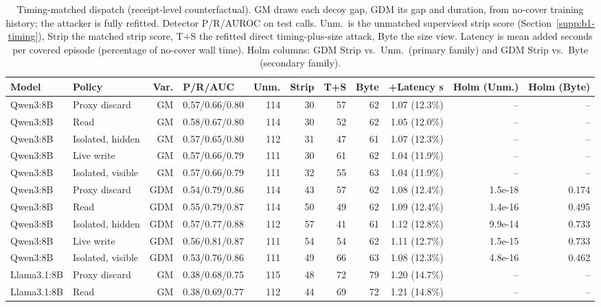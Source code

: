 \begin{table}[t]\centering\small
\caption{Timing-matched dispatch (receipt-level counterfactual). GM draws each decoy gap, GDM its gap and duration, from no-cover training history; the attacker is fully refitted. Detector P/R/AUROC on test calls. Unm.\ is the unmatched supervised strip score (Section~\ref{supp:b1-timing}), Strip the matched strip score, T+S the refitted direct timing-plus-size attack, Byte the size view. Latency is mean added seconds per covered episode (percentage of no-cover wall time). Holm columns: GDM Strip vs.\ Unm.\ (primary family) and GDM Strip vs.\ Byte (secondary family).}\label{tab:c3}
\setlength{\tabcolsep}{4pt}
\begin{tabularx}{\textwidth}{@{}llrYrrrrrrr@{}}\toprule
Model & Policy & Var. & P/R/AUC & Unm. & Strip & T+S & Byte & +Latency s & Holm (Unm.) & Holm (Byte)\\\midrule
Qwen3:8B & Proxy discard & GM & 0.57/0.66/0.80 & 114 & 30 & 57 & 62 & 1.07 (12.3\%) & -- & -- \\
Qwen3:8B & Read & GM & 0.58/0.67/0.80 & 114 & 30 & 52 & 62 & 1.05 (12.0\%) & -- & -- \\
Qwen3:8B & Isolated, hidden & GM & 0.57/0.65/0.80 & 112 & 31 & 47 & 61 & 1.07 (12.3\%) & -- & -- \\
Qwen3:8B & Live write & GM & 0.57/0.66/0.79 & 111 & 30 & 61 & 62 & 1.04 (11.9\%) & -- & -- \\
Qwen3:8B & Isolated, visible & GM & 0.57/0.66/0.79 & 111 & 32 & 55 & 63 & 1.04 (11.9\%) & -- & -- \\
Qwen3:8B & Proxy discard & GDM & 0.54/0.79/0.86 & 114 & 43 & 57 & 62 & 1.08 (12.4\%) & 1.5e-18 & 0.174 \\
Qwen3:8B & Read & GDM & 0.55/0.79/0.87 & 114 & 50 & 49 & 62 & 1.09 (12.4\%) & 1.4e-16 & 0.495 \\
Qwen3:8B & Isolated, hidden & GDM & 0.57/0.77/0.88 & 112 & 57 & 41 & 61 & 1.12 (12.8\%) & 9.9e-14 & 0.733 \\
Qwen3:8B & Live write & GDM & 0.56/0.81/0.87 & 111 & 54 & 54 & 62 & 1.11 (12.7\%) & 1.5e-15 & 0.733 \\
Qwen3:8B & Isolated, visible & GDM & 0.53/0.76/0.86 & 111 & 49 & 66 & 63 & 1.08 (12.3\%) & 4.8e-16 & 0.462 \\
Llama3.1:8B & Proxy discard & GM & 0.38/0.68/0.75 & 115 & 48 & 72 & 79 & 1.20 (14.7\%) & -- & -- \\
Llama3.1:8B & Read & GM & 0.38/0.69/0.77 & 112 & 44 & 69 & 72 & 1.21 (14.8\%) & -- & -- \\

\end{tabularx}
\end{table}
